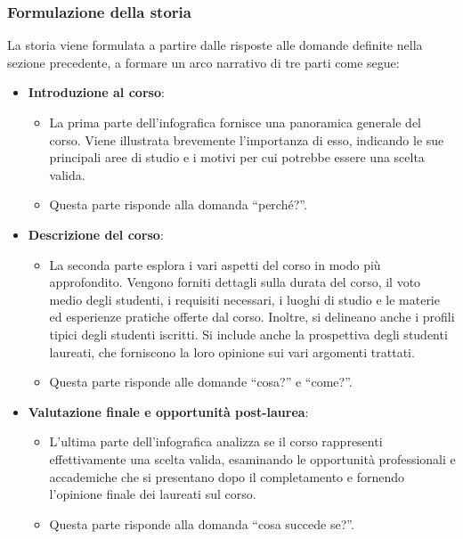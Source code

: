 \subsubsection{Formulazione della storia}\label{subsubsec:app_storia}
La storia viene formulata a partire dalle risposte alle domande definite nella sezione precedente, a formare un arco narrativo di tre parti come segue:
\begin{itemize}
    \item \textbf{Introduzione al corso}:
    \begin{itemize}
        \item La prima parte dell'infografica fornisce una panoramica generale del corso. Viene illustrata brevemente l'importanza di esso, indicando le sue principali aree di studio e 
        i motivi per cui potrebbe essere una scelta valida. 
        \item Questa parte risponde alla domanda ``perché?''.
    \end{itemize}
    \item \textbf{Descrizione del corso}:
    \begin{itemize}
        \item La seconda parte esplora i vari aspetti del corso in modo più approfondito. Vengono forniti dettagli sulla durata del corso, il voto medio degli studenti, i requisiti necessari, i luoghi di studio e 
        le materie ed esperienze pratiche offerte dal corso. Inoltre, si delineano anche i profili tipici degli studenti iscritti.
        Si include anche la prospettiva degli studenti laureati, che forniscono la loro opinione sui vari argomenti trattati.
        \item Questa parte risponde alle domande ``cosa?'' e ``come?''.
    \end{itemize} 
    \item \textbf{Valutazione finale e opportunità post-laurea}:
    \begin{itemize}
        \item L'ultima parte dell'infografica analizza se il corso rappresenti effettivamente una scelta valida, esaminando le opportunità professionali e accademiche che si presentano dopo il completamento e fornendo 
        l'opinione finale dei laureati sul corso.
        \item Questa parte risponde alla domanda ``cosa succede se?''.
    \end{itemize}
\end{itemize}

